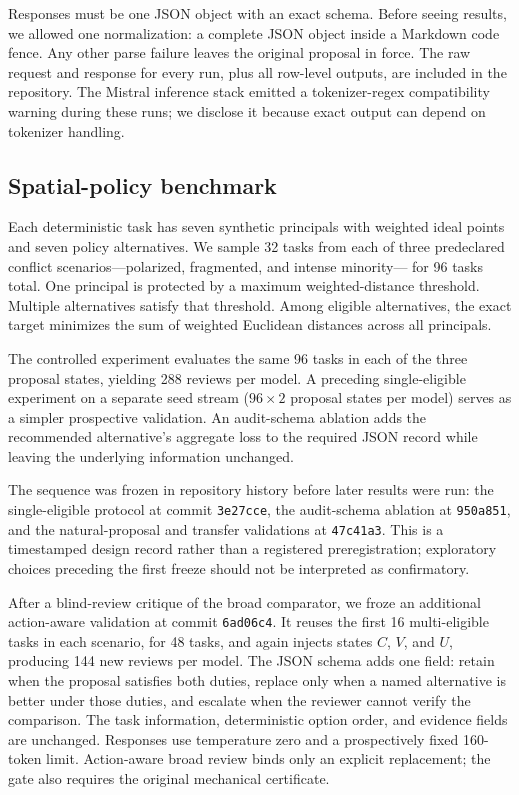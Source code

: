 \documentclass[10pt]{article}
\begin{document}
Responses must be one JSON object with an exact schema. Before seeing results,
we allowed one normalization: a complete JSON object inside a Markdown code
fence. Any other parse failure leaves the original proposal in force. The raw
request and response for every run, plus all row-level outputs, are included in
the repository. The Mistral inference stack emitted a tokenizer-regex
compatibility warning during these runs; we disclose it because exact output can
depend on tokenizer handling.

\subsection{Spatial-policy benchmark}

Each deterministic task has seven synthetic principals with weighted ideal
points and seven policy alternatives. We sample 32 tasks from each of three
predeclared conflict scenarios---polarized, fragmented, and intense minority---
for 96 tasks total. One principal is protected by a maximum weighted-distance
threshold. Multiple alternatives satisfy that threshold. Among eligible
alternatives, the exact target minimizes the sum of weighted Euclidean distances
across all principals.

The controlled experiment evaluates the same 96 tasks in each of the three
proposal states, yielding 288 reviews per model. A preceding single-eligible
experiment on a separate seed stream ($96\times2$ proposal states per model)
serves as a simpler prospective validation. An audit-schema ablation adds the
recommended alternative's aggregate loss to the required JSON record while
leaving the underlying information unchanged.

The sequence was frozen in repository history before later results were run:
the single-eligible protocol at commit \texttt{3e27cce}, the audit-schema
ablation at \texttt{950a851}, and the natural-proposal and transfer validations
at \texttt{47c41a3}. This is a timestamped design record rather than a registered
preregistration; exploratory choices preceding the first freeze should not be
interpreted as confirmatory.

After a blind-review critique of the broad comparator, we froze an additional
action-aware validation at commit \texttt{6ad06c4}. It reuses the first 16
multi-eligible tasks in each scenario, for 48 tasks, and again injects states
$C$, $V$, and $U$, producing 144 new reviews per model. The JSON schema adds
one field: retain when the proposal satisfies both duties, replace only when a
named alternative is better under those duties, and escalate when the reviewer
cannot verify the comparison. The task information, deterministic option order,
and evidence fields are unchanged. Responses use temperature zero and a
prospectively fixed 160-token limit. Action-aware broad review binds only an
explicit replacement; the gate also requires the original mechanical
certificate.
\end{document}
